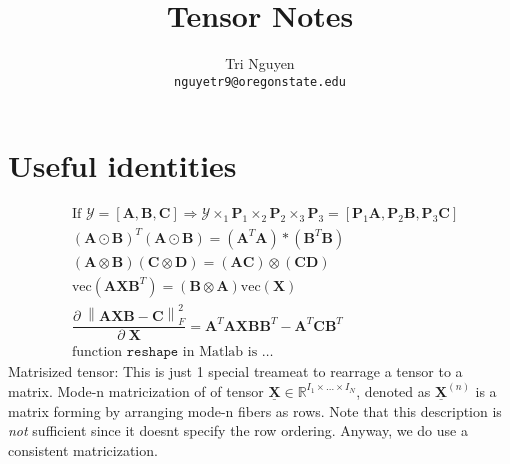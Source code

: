 \documentclass[11pt,a4paper]{article}
\title{Tensor Notes}
\author{	Tri Nguyen \\
        \texttt{nguyetr9@oregonstate.edu} \\
        }
\newcommand{\norm}[1]{\left\lVert#1\right\rVert}
\theoremstyle{plain}
\theoremstyle{definition}
\theoremstyle{remark}
\begin{document}
\maketitle

\section{Useful identities}%
\label{sec:usefull_identities}
\begin{align}
    &\text{If } \mathcal{Y} = [\mathbf{A}, \mathbf{B}, \mathbf{C}] \Rightarrow \mathcal{Y} \times_{1} \mathbf{P}_1 \times_{2} \mathbf{P}_2 \times_{3} \mathbf{P}_3 = [\mathbf{P}_1 \mathbf{A}, \mathbf{P}_2 \mathbf{B}, \mathbf{P}_3 \mathbf{C}] \label{eq:tensor_mode_product} \\
    &(\mathbf{A} \odot \mathbf{B})^T (\mathbf{A} \odot  \mathbf{B}) = (\mathbf{A}^T \mathbf{A}) * (\mathbf{B}^T \mathbf{B}) \label{eq:khatrirao_hadamard}\\
    & (\mathbf{A} \otimes \mathbf{B}) (\mathbf{C} \otimes \mathbf{D}) = (\mathbf{A}\mathbf{C}) \otimes (\mathbf{C} \mathbf{D}) \\
    &\text{vec}(\mathbf{A} \mathbf{X}\mathbf{B}^T ) =  (\mathbf{B} \otimes \mathbf{A}) \text{vec}(\mathbf{X}) \\
    &\dfrac{\partial\; \norm{\mathbf{A}\mathbf{X}\mathbf{B} - \mathbf{C}}_F^2}{\partial\; \mathbf{X}} 
    = \mathbf{A}^T \mathbf{A} \mathbf{X} \mathbf{B}\mathbf{B}^T  - \mathbf{A}^T \mathbf{C} \mathbf{B}^T  \label{eq:derivative_AXB} \\
    &\text{function } \texttt{reshape} \text{ in Matlab is \ldots }
\end{align}
Matrisized tensor: This is just 1 special treameat to rearrage a tensor to a matrix. Mode-n matricization of of tensor $\underline{\mathbf{X}} \in \mathbb{R}^{I_1 \times \ldots  \times I_N}$, denoted as $\underline{\mathbf{X}}^{(n)}$ is a matrix forming by arranging mode-n fibers as rows. Note that this description is \textit{not} sufficient since it doesnt specify the row ordering. Anyway, we do use a consistent matricization.
\end{document}
